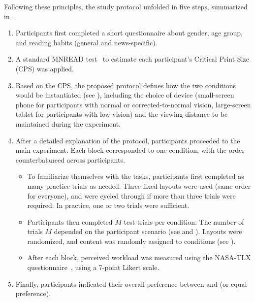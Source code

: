 Following these principles, the study protocol unfolded in five steps, summarized in . 
\begin{enumerate}
    \item Participants first completed a short questionnaire about gender, age group, and reading habits (general and news-specific). 
     \item A standard MNREAD test~\cite{legge2006} to estimate each participant's Critical Print Size (CPS) was applied. 
    \item Based on the CPS, the proposed protocol defines how the two conditions would be instantiated (see ), including the choice of device (small-screen phone for participants with normal or corrected-to-normal vision, large-screen tablet for participants with low vision) and the viewing distance to be maintained during the experiment.
    \item After a detailed explanation of the protocol, participants proceeded to the main experiment. Each block corresponded to one condition, with the order counterbalanced across participants.
    \begin{itemize}
        \item To familiarize themselves with the tasks, participants first completed as many practice trials as needed. Three fixed layouts were used (same order for everyone), and were cycled through if more than three trials were required. In practice, one or two trials were sufficient. 
        \item Participants then completed $M$ test trials per condition. The number of trials $M$ depended on the participant scenario (see  and ). Layouts were randomized, and content was randomly assigned to conditions (see ).
        \item After each block, perceived workload was measured using the NASA-TLX questionnaire~\cite{hart_nasa-task_2006}, using a 7-point Likert scale.
    \end{itemize}
    \item Finally, participants indicated their overall preference between \condonenot and \condtwonot (or equal preference).
\end{enumerate}
